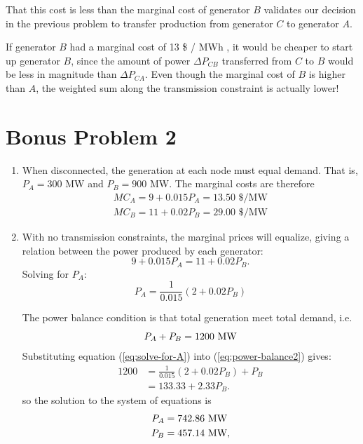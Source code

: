 \documentclass{homework}
\begin{document}
That this cost is less than the marginal cost of generator $B$ validates our decision in the previous
problem to transfer production from generator $C$ to generator $A$.

If generator $B$ had a marginal cost
of 13 \$ / MWh , it would be cheaper to start up generator $B$, since the amount of power $\Delta P_{CB}$ transferred
from $C$ to $B$ would be less in magnitude than $\Delta P_{CA}$. Even though the marginal cost of $B$ is higher than $A$,
the weighted sum along the transmission constraint is actually lower!


\section{Bonus Problem 2}

\begin{enumerate}
    \item When disconnected, the generation at each node must equal demand. That is, $P_A = 300$ MW and
    $P_B = 900$ MW. The marginal costs are therefore
    \begin{align*}
        MC_A = 9 + 0.015 P_A = 13.50 \text{ \$/MW} \\
        MC_B = 11 + 0.02 P_B = 29.00 \text{ \$/MW}
    \end{align*}

    \item With no transmission constraints, the marginal prices will equalize, giving
    a relation between the power produced by each generator:
    \begin{equation*}
        9 + 0.015 P_A = 11 + 0.02 P_B.
    \end{equation*}
    Solving for $P_A$:
    \begin{equation}
        P_A = \frac{1}{0.015} (2 + 0.02 P_B)
        \label{eq:solve-for-A}
    \end{equation}

    The power balance condition is that total generation meet total demand, i.e.
    \begin{equation}
        P_A + P_B = 1200 \text{ MW}
        \label{eq:power-balance2}
    \end{equation}
    Substituting equation (\ref{eq:solve-for-A}) into (\ref{eq:power-balance2})
    gives:
    \begin{align*}
        1200 &= \frac{1}{0.015} (2 + 0.02 P_B) + P_B \\
            &= 133.33 + 2.33 P_B.
    \end{align*}
    so the solution to the system of equations is
    \begin{align*}
        P_A &= 742.86 \text{ MW} \\
        P_B &= 457.14 \text{ MW},
    \end{align*}


\end{enumerate}
\end{document}

